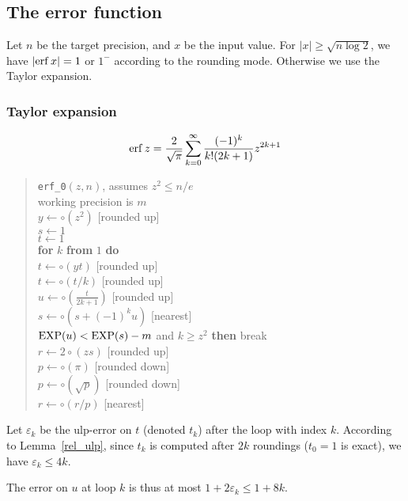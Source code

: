 \documentclass[12pt]{amsart}
\def\q{\hspace*{5mm}}
\begin{document}
\subsection{The error function}

Let $n$ be the target precision, and $x$ be the input value.
For $|x| \geq \sqrt{n \log 2}$, we have $|{\rm erf} \, x| = 1$
or $1^{-}$ according to the rounding mode.
Otherwise we use the Taylor expansion.

\subsubsection{Taylor expansion}

\[ {\rm erf} \, z = \frac{2}{\sqrt{\pi}} \sum_{k=0}^{\infty} \frac{(-1)^k}
        {k! (2k+1)} z^{2k+1} \]

\begin{quote}
\verb|erf_0|$(z, n)$, assumes $z^2 \le n/e$ \\
working precision is $m$ \\
$y \leftarrow \circ (z^2)$ [rounded up] \\
$s \leftarrow 1$ \\
$t \leftarrow 1$ \\
{\bf for} $k$ {\bf from} $1$ {\bf do} \\
\q $t \leftarrow \circ (y t)$ [rounded up] \\
\q $t \leftarrow \circ (t/k)$ [rounded up] \\
\q $u \leftarrow \circ (\frac{t}{2k+1})$ [rounded up] \\
\q $s \leftarrow \circ (s + (-1)^k u)$ [nearest] \\
\q {\bf if} ${\rm EXP}(u) < {\rm EXP}(s) - m$ and $k \geq z^2$
        {\bf then} break \\
$r \leftarrow 2 \circ (z s)$ [rounded up] \\
$p \leftarrow \circ (\pi)$ [rounded down] \\
$p \leftarrow \circ (\sqrt{p})$ [rounded down] \\
$r \leftarrow \circ (r/p)$ [nearest]
\end{quote}

Let $\varepsilon_k$ be the ulp-error on $t$ (denoted $t_k$)
after the loop with index $k$.
According to Lemma~\ref{rel_ulp}, since $t_k$ is computed after $2k$
roundings ($t_0=1$ is exact), we have $\varepsilon_k \leq 4k$.

The error on $u$ at loop $k$ is thus at most
$1+2\varepsilon_k \leq 1+8k$.
\end{document}
